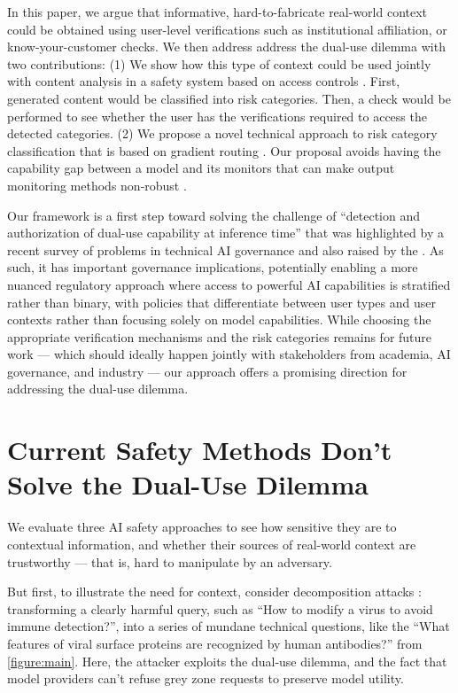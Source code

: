 \documentclass{article}
\theoremstyle{plain}
\theoremstyle{definition}
\theoremstyle{remark}
\begin{document}
In this paper, we argue that informative, hard-to-fabricate
real-world context could be obtained using user-level verifications
such as institutional affiliation, or know-your-customer checks. We
then address address the dual-use dilemma with two contributions:
(1) We show how this type of context could be used jointly with
content analysis in a safety system based on access controls
\cite{butler1974}. First, generated content would be classified into
risk categories. Then, a check would be performed to see whether the
user has the verifications required to access the detected
categories. (2) We propose a novel technical approach to risk
category classification that is based on gradient routing
\cite{cloud2024gradientroutingmaskinggradients}. Our proposal avoids
having the capability gap between a model and its monitors that can
make output monitoring methods non-robust
\cite{jin2024jailbreakinglargelanguagemodels}.

Our framework is a first step toward solving the challenge of
``detection and authorization of dual-use capability at inference
time'' that was highlighted by a recent survey of problems in
technical AI governance \cite{reuel2025openproblemstechnicalai} and
also raised by the \citet{NIST_AI_800_1_ipd_2024}.
As such, it has important governance implications, potentially
enabling a more nuanced regulatory approach where access to powerful
AI capabilities is stratified rather than binary, with policies that
differentiate between user types and user contexts rather than
focusing solely on model capabilities. While choosing the appropriate
verification mechanisms and the risk categories remains for future
work --- which should ideally happen jointly with stakeholders from
academia, AI governance, and industry --- our approach offers a
promising direction for addressing the dual-use dilemma.

\section{Current Safety Methods Don't Solve the Dual-Use Dilemma}
\label{section:current-methods}

We evaluate three AI safety approaches to see how sensitive they are
to contextual information, and whether their sources of real-world
context are trustworthy --- that is, hard to manipulate by an adversary.

But first, to illustrate the need for context, consider decomposition
attacks \cite{glukhov2023llmcensorshipmachinelearning,
glukhov2024breachthousandleaksunsafe}: transforming a clearly harmful
query, such as ``How to modify a virus to avoid immune detection?'',
into a series of mundane technical questions, like the ``What
features of viral surface proteins are recognized by human
antibodies?'' from \cref{figure:main}. Here, the attacker exploits
the dual-use dilemma, and the fact that model providers can't refuse
grey zone requests to preserve model utility.
\end{document}

